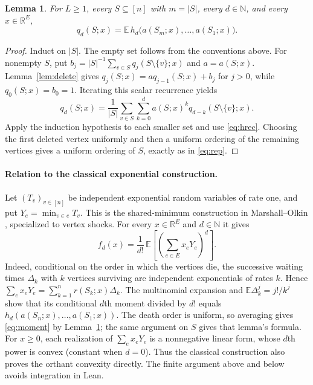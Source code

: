 \documentclass[11pt]{article}
\newtheorem{lemma}[theorem]{Lemma}
\newcommand{\R}{\mathbb R}
\newcommand{\N}{\mathbb N}
\begin{document}
\begin{lemma}\label{lem:rep}
For $L\geq1$, every $S\subseteq[n]$ with $m=|S|$, every $d\in\N$,
and every $x\in\R^E$,
\begin{equation}\label{eq:rep}
 q_d(S;x)=\mathbb E\,h_d\bigl(a(S_m;x),\ldots,a(S_1;x)\bigr).
\end{equation}
\end{lemma}
\begin{proof}
Induct on $|S|$. The empty set follows from the conventions above.
For nonempty $S$, put
$b_j=|S|^{-1}\sum_{v\in S}q_j(S\setminus\{v\};x)$ and $a=a(S;x)$.
Lemma~\ref{lem:delete} gives $q_j(S;x)=a q_{j-1}(S;x)+b_j$ for $j>0$,
while $q_0(S;x)=b_0=1$. Iterating this scalar recurrence yields
\[
 q_d(S;x)=\frac1{|S|}\sum_{v\in S}\sum_{k=0}^d
        a(S;x)^k q_{d-k}(S\setminus\{v\};x).
\]
Apply the induction hypothesis to each smaller set and use
\eqref{eq:hrec}. Choosing the first deleted vertex uniformly and then
a uniform ordering of the remaining vertices gives a uniform ordering
of $S$, exactly as in \eqref{eq:rep}.
\end{proof}

\paragraph{Relation to the classical exponential construction.}
Let $(T_v)_{v\in[n]}$ be independent exponential random variables of
rate one, and put $Y_e=\min_{v\in e}T_v$. This is the shared-minimum
construction in Marshall--Olkin \cite[p.~18; see also (4.2)--(4.6)]{MO},
specialized to vertex shocks. For every $x\in\R^E$ and $d\in\N$ it gives
\begin{equation}\label{eq:moment}
 f_d(x)=\frac1{d!}\,\mathbb E\!\left[\left(\sum_{e\in E}x_eY_e\right)^d\right].
\end{equation}
Indeed, conditional on the order in which the vertices die, the successive
waiting times $\Delta_k$ with $k$ vertices surviving are independent
exponentials of rates $k$. Hence
$\sum_e x_eY_e=\sum_{k=1}^n r(S_k;x)\Delta_k$.
The multinomial expansion and $\mathbb E\Delta_k^j=j!/k^j$ show that its
conditional $d$th moment divided by $d!$ equals
$h_d(a(S_n;x),\ldots,a(S_1;x))$.
The death order is uniform, so averaging gives \eqref{eq:moment} by
Lemma~\ref{lem:rep}; the same argument on $S$ gives that lemma's formula.
For $x\geq0$, each realization of $\sum_e x_eY_e$ is a nonnegative linear
form, whose $d$th power is convex (constant when $d=0$).
Thus the classical construction also proves the orthant convexity
directly. The finite argument above and below avoids integration in Lean.
\end{document}
